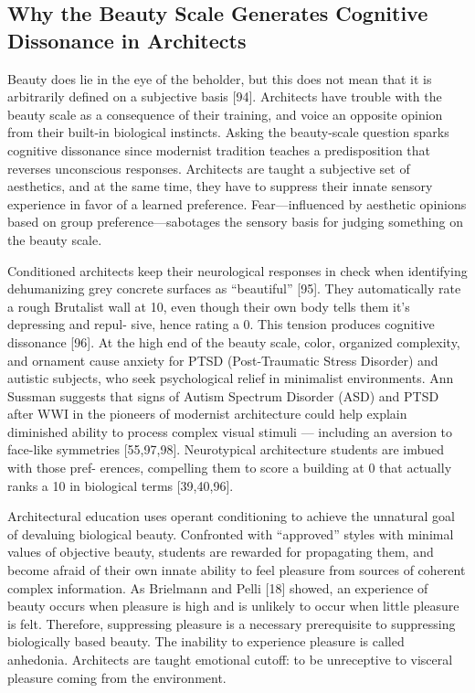 \documentclass[a4paper]{article}
\begin{document}
\subsection{Why the Beauty Scale Generates Cognitive Dissonance in Architects}

Beauty does lie in the eye of the beholder, but this does not mean that it is arbitrarily
defined on a subjective basis [94]. Architects have trouble with the beauty scale as a
consequence of their training, and voice an opposite opinion from their built-in biological
instincts. Asking the beauty-scale question sparks cognitive dissonance since modernist
tradition teaches a predisposition that reverses unconscious responses. Architects are
taught a subjective set of aesthetics, and at the same time, they have to suppress their
innate sensory experience in favor of a learned preference. Fear—influenced by aesthetic
opinions based on group preference—sabotages the sensory basis for judging something
on the beauty scale.

Conditioned architects keep their neurological responses in check when identifying
dehumanizing grey concrete surfaces as “beautiful” [95]. They automatically rate a rough
Brutalist wall at 10, even though their own body tells them it’s depressing and repul-
sive, hence rating a 0. This tension produces cognitive dissonance [96]. At the high end
of the beauty scale, color, organized complexity, and ornament cause anxiety for PTSD
(Post-Traumatic Stress Disorder) and autistic subjects, who seek psychological relief in
minimalist environments. Ann Sussman suggests that signs of Autism Spectrum Disorder
(ASD) and PTSD after WWI in the pioneers of modernist architecture could help explain
diminished ability to process complex visual stimuli — including an aversion to face-like
symmetries [55,97,98]. Neurotypical architecture students are imbued with those pref-
erences, compelling them to score a building at 0 that actually ranks a 10 in biological
terms [39,40,96].

Architectural education uses operant conditioning to achieve the unnatural goal of
devaluing biological beauty. Confronted with “approved” styles with minimal values
of objective beauty, students are rewarded for propagating them, and become afraid of
their own innate ability to feel pleasure from sources of coherent complex information. As
Brielmann and Pelli [18] showed, an experience of beauty occurs when pleasure is high
and is unlikely to occur when little pleasure is felt. Therefore, suppressing pleasure is a
necessary prerequisite to suppressing biologically based beauty. The inability to experience
pleasure is called anhedonia. Architects are taught emotional cutoff: to be unreceptive to
visceral pleasure coming from the environment.
\end{document}
